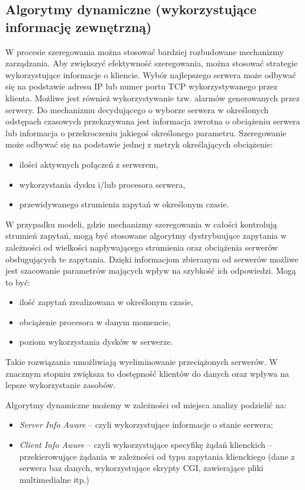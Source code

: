 \subsection{Algorytmy dynamiczne (wykorzystujące informację zewnętrzną)}
W procesie szeregowania można stosować bardziej rozbudowane mechanizmy zarządzania. Aby zwiększyć efektywność szeregowania, 
można stosować strategie wykorzystujące informacje o kliencie. Wybór najlepszego serwera może odbywać się na podstawie adresu 
IP lub numer portu TCP wykorzystywanego przez klienta. Możliwe jest również wykorzystywanie tzw. alarmów generowanych przez 
serwery. Do mechanizmu decydującego o wyborze serwera w określonych odstępach czasowych przekazywana jest informacja zwrotna o 
obciążeniu serwera lub informacja o przekroczeniu jakiegoś określonego parametru. Szeregowanie może odbywać się na podstawie 
jednej z metryk określających obciążenie:
\begin{itemize}
\item ilości aktywnych połączeń z serwerem,
\item wykorzystania dysku i/lub procesora serwera,
\item przewidywanego strumienia zapytań w określonym czasie.
\end{itemize}

W przypadku modeli, gdzie mechanizmy szeregowania w całości kontrolują strumień zapytań, mogą być stosowane algorytmy 
dystrybuujące zapytania w zależności od wielkości napływającego strumienia oraz obciążenia serwerów obsługujących te 
zapytania. Dzięki informacjom zbieranym od serwerów możliwe jest szacowanie parametrów mających wpływ na szybkość ich 
odpowiedzi. Mogą to być:
\begin{itemize}
\item ilość zapytań zrealizowana w określonym czasie,
\item obciążenie procesora w danym momencie,
\item poziom wykorzystania dysków w serwerze.
\end{itemize}
Takie rozwiązania umożliwiają wyeliminowanie przeciążonych serwerów. W znacznym stopniu zwiększa to dostępność klientów do 
danych oraz wpływa na lepsze wykorzystanie zasobów. 

Algorytmy dynamiczne możemy w zależności od miejsca analizy podzielić na:
\begin{itemize}
\item \emph{Server Info Aware} -- czyli wykorzystujące informacje o stanie serwera;
\item \emph{Client Info Aware} -- czyli wykorzystujące specyfikę żądań klienckich -- przekierowujące żądania w zależności
od typu zapytania klienckiego (dane z serwera baz danych, wykorzystujące skrypty CGI, zawierające pliki multimedialne itp.)
\end{itemize}

